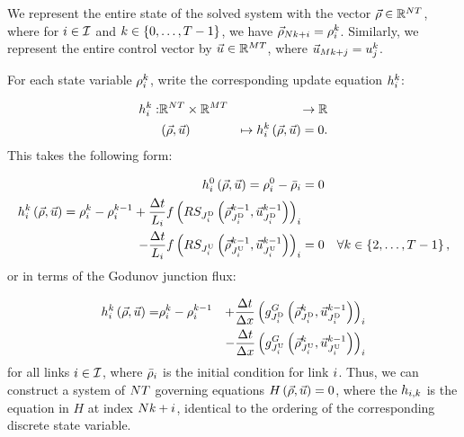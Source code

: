 We represent the entire state of the solved system with the vector
$\vec{\rho}\in\mathbb{R}^{NT}$, where for $i\in\mathcal{I}$
and $k\in\left\{ 0,\ldots,T-1\right\}$, we have $\vec{\rho}_{N k+i}=\rho_{i}^{k}$.
Similarly, we represent the entire control vector by $\vec{u}\in\mathbb{R}^{MT}$,
where $\vec{u}_{Mk+j}=u_{j}^{k}$.

For each state variable $\rho_{i}^{k}$, write the corresponding
update equation $h_{i}^{k}$:

\begin{eqnarray*}
	h_{i}^{k}: & \mathbb{R}^{NT}\times\mathbb{R}^{MT} & \rightarrow\mathbb{R}\\
	& \left(\vec{\rho},\vec{u}\right) & \mapsto h_{i}^{k}\left(\vec{\rho},\vec{u}\right)=0.
\end{eqnarray*}
This takes the following form:

\begin{eqnarray}
	h_{i}^{0}\left(\vec{\rho},\vec{u}\right)=\rho_{i}^{0}-\bar{\rho}_{i} & =0\label{eq:init-ge}\\
	h_{i}^{k}\left(\vec{\rho},\vec{u}\right)=\rho_{i}^{k}-\rho_{i}^{k-1}+\frac{\Delta t}{L_{i}}f\left(RS_{J_{i}^{\text{D}}}\left(\vec{\rho}_{J_{i}^{\text{D}}}^{k-1},\vec{u}_{J_{i}^{\text{D}}}^{k-1}\right)\right)_{i}\nonumber \\
	-\frac{\Delta t}{L_{i}}f\left(RS_{J_{i}^{\text{U}}}\left(\vec{\rho}_{J_{i}^{\text{U}}}^{k-1},\vec{u}_{J_{i}^{\text{U}}}^{k-1}\right)\right)_{i} & =0 & \forall k\in\left\{ 2,\ldots,T-1\right\},\label{eq:main-ge}
\end{eqnarray}
or in terms of the Godunov junction flux:

\begin{eqnarray}
	h_{i}^{k}\left(\vec{\rho},\vec{u}\right)= & \rho_{i}^{k}-\rho_{i}^{k-1} & +\dfrac{\Delta t}{\Delta x}\left(g^{G}_{J_{i}^{\text{D}}}\left(\vec{\rho}_{J_{i}^{\text{D}}}^{k},\vec{u}_{J_{i}^{\text{D}}}^{k-1}\right)\right)_{i}\nonumber \\
	&  & -\dfrac{\Delta t}{\Delta x}\left(g^{G}_{J_{i}^{\text{U}}}\left(\vec{\rho}_{J_{i}^{\text{U}}}^{k},\vec{u}_{J_{i}^{\text{U}}}^{k-1}\right)\right)_{i}\label{eq:syseq-god}
\end{eqnarray}
for all links $i\in\mathcal{I}$, where $\bar{\rho}_{i}$ is
the initial condition for link $i$. Thus, we can construct a
system of $N T$ governing equations $H\left(\vec{\rho},\vec{u}\right)=0$,
where the $h_{i,k}$ is the equation in $H$ at index $N k+i$,
identical to the ordering of the corresponding discrete state variable. 
